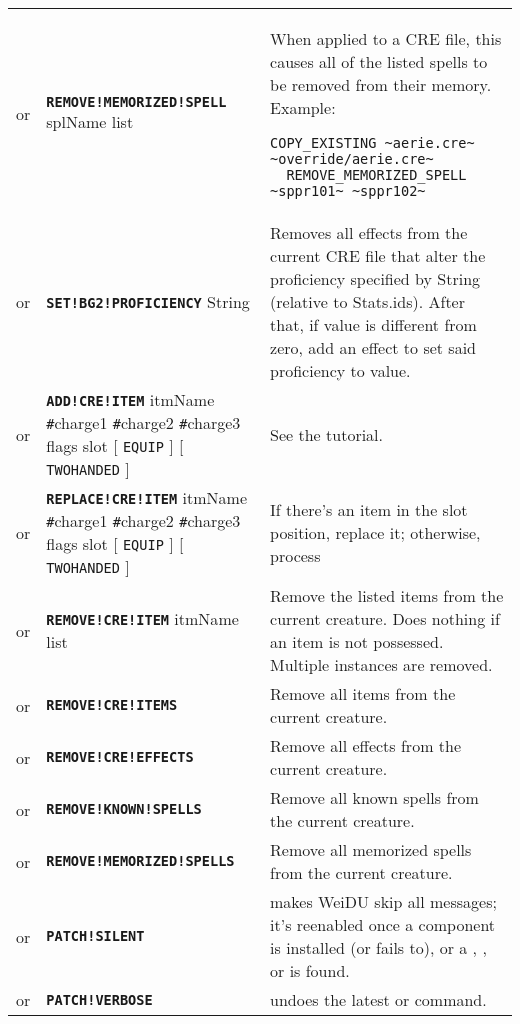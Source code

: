 \documentclass{article}
\def\ttref#1{\ahrefloc{#1}{\tt #1}}
\def\DEFINE#1{{\tt \bf #1}\label{#1}\index{#1}}
\def\DEFSYN#1{{\tt \bf #1}\index{#1}}
\def\t#1{{\tt #1}}
\def\Slist{{\color{red} list }}
\def\Ob{{\color{red} [ }}
\def\Oe{{\color{red} ] }}
\begin{document}
\begin{tabular}{cp{10in}|p{10in}}
or & \DEFINE{REMOVE!MEMORIZED!SPELL} splName \Slist &
  When applied to a CRE file, this \ttref{patch} causes all of the
  listed spells to be removed from their memory. Example:
\begin{verbatim}
COPY_EXISTING ~aerie.cre~ ~override/aerie.cre~
  REMOVE_MEMORIZED_SPELL ~sppr101~ ~sppr102~
\end{verbatim}
 \\

or & \DEFINE{SET!BG2!PROFICIENCY} String \ttref{value} &
	Removes all effects from the current CRE file that alter the proficiency specified by
	String (relative to Stats.ids). After that, if value is different from zero, add an effect
	to set said proficiency to value. \\

or & \DEFSYN{ADD!CRE!ITEM} itmName \t{\#}charge1 \t{\#}charge2 \t{\#}charge3 flags slot \Ob
\t{EQUIP} \Oe \Ob \t{TWOHANDED} \Oe &
  See the \ttref{ADD!CRE!ITEM} tutorial. \\

or & \DEFINE{REPLACE!CRE!ITEM} itmName \t{\#}charge1 \t{\#}charge2 \t{\#}charge3 flags slot \Ob
\t{EQUIP} \Oe \Ob \t{TWOHANDED} \Oe &
  If there's an item in the slot position, replace it; otherwise, process \ttref{ADD!CRE!ITEM} \\

or & \DEFINE{REMOVE!CRE!ITEM} itmName \Slist &
  Remove the listed items from the current creature. Does nothing if an item is not possessed.
	Multiple instances are removed. \\

or & \DEFINE{REMOVE!CRE!ITEMS} &
  Remove all items from the current creature. \\
or & \DEFINE{REMOVE!CRE!EFFECTS} &
  Remove all effects from the current creature. \\
or & \DEFINE{REMOVE!KNOWN!SPELLS} &
  Remove all known spells from the current creature. \\
or & \DEFINE{REMOVE!MEMORIZED!SPELLS} &
  Remove all memorized spells from the current creature. \\
or & \DEFINE{PATCH!SILENT} & makes WeiDU skip all messages; it's reenabled once a component
    is installed (or fails to), or a \ttref{PRINT}, \ttref{PATCH!PRINT},
    \ttref{VERBOSE} or \ttref{PATCH!VERBOSE} is found. \\
or & \DEFINE{PATCH!VERBOSE} & undoes the latest \ttref{SILENT} or \ttref{PATCH!SILENT} command. \\


\end{tabular}
\end{document}
